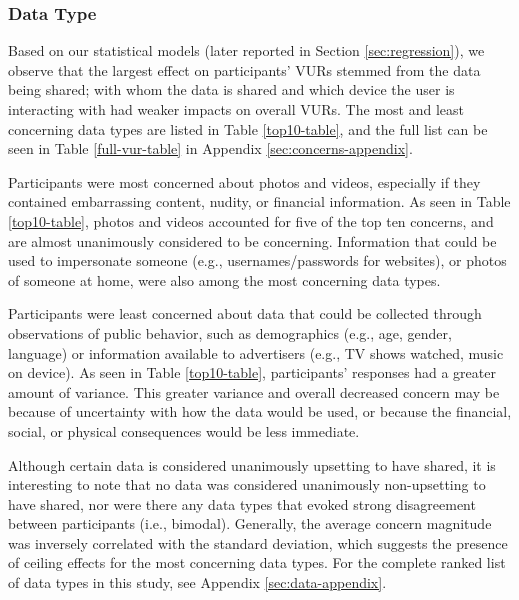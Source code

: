 
\subsubsection{Data Type}
\label{sec:datatypes}

Based on our statistical models (later reported in Section \ref{sec:regression}), we observe that the largest effect on participants' VURs stemmed from the data being shared; with whom the data is shared and which device the user is interacting with had weaker impacts on overall VURs. The most and least concerning data types are listed in Table \ref{top10-table}, and the full list can be seen in Table \ref{full-vur-table} in Appendix \ref{sec:concerns-appendix}. 

Participants were most concerned about photos and videos, especially if they contained embarrassing content, nudity, or financial information. As seen in Table \ref{top10-table}, photos and videos accounted for five of the top ten concerns, and are almost unanimously considered to be concerning. Information that could be used to impersonate someone (e.g., usernames/passwords for websites), or photos of someone at home, were also among the most concerning data types. 

Participants were least concerned about data that could be collected through observations of public behavior, such as demographics (e.g., age, gender, language) or information available to advertisers (e.g., TV shows watched, music on device). As seen in Table \ref{top10-table}, participants' responses had a greater amount of variance.  This greater variance and overall decreased concern may be because of uncertainty with how the data would be used, or because the financial, social, or physical consequences would be less immediate.

Although certain data is considered unanimously upsetting to have shared, it is interesting to note that no data was considered unanimously non-upsetting to have shared, nor were there any data types that evoked strong disagreement between participants (i.e., bimodal). Generally, the average concern magnitude was inversely correlated with the standard deviation, which suggests the presence of ceiling effects for the most concerning data types. For the complete ranked list of data types in this study, see Appendix \ref{sec:data-appendix}.

